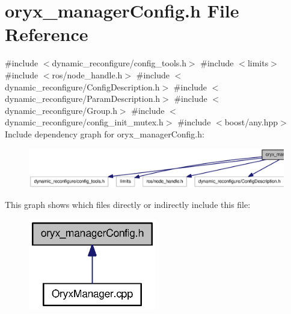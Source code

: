 \section{oryx\-\_\-manager\-Config.\-h \-File \-Reference}
\label{oryx__managerConfig_8h}
{\ttfamily \#include $<$dynamic\-\_\-reconfigure/config\-\_\-tools.\-h$>$}\*
{\ttfamily \#include $<$limits$>$}\*
{\ttfamily \#include $<$ros/node\-\_\-handle.\-h$>$}\*
{\ttfamily \#include $<$dynamic\-\_\-reconfigure/\-Config\-Description.\-h$>$}\*
{\ttfamily \#include $<$dynamic\-\_\-reconfigure/\-Param\-Description.\-h$>$}\*
{\ttfamily \#include $<$dynamic\-\_\-reconfigure/\-Group.\-h$>$}\*
{\ttfamily \#include $<$dynamic\-\_\-reconfigure/config\-\_\-init\-\_\-mutex.\-h$>$}\*
{\ttfamily \#include $<$boost/any.\-hpp$>$}\*
\-Include dependency graph for oryx\-\_\-manager\-Config.\-h\-:
\nopagebreak
\begin{figure}[H]
\begin{center}
\leavevmode
\includegraphics[width=350pt]{oryx__managerConfig_8h__incl}
\end{center}
\end{figure}
\-This graph shows which files directly or indirectly include this file\-:
\nopagebreak
\begin{figure}[H]
\begin{center}
\leavevmode
\includegraphics[width=158pt]{oryx__managerConfig_8h__dep__incl}
\end{center}
\end{figure}
